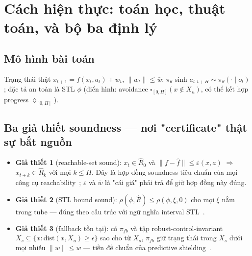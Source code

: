 \documentclass[a4paper,12pt]{article}
\let\stdsection\section
\renewcommand{\section}{\clearpage\stdsection}
\begin{document}
\section{Cách hiện thực: toán học, thuật toán, và bộ ba định lý}\label{sec:implementation}
\subsection{Mô hình bài toán}
Trạng thái thật $x_{t+1}=f(x_t,a_t)+w_t$, $\|w_t\|\le\bar w$; $\pi_\theta$ sinh $a_{t:t+H}\sim\pi_\theta(\cdot\mid o_t)$; đặc tả an toàn là STL $\phi$ (điển hình: avoidance $\square_{[0,H]}(x\notin X_u)$, có thể kết hợp progress $\lozenge_{[0,H]}$).

\subsection{Ba giả thiết soundness --- nơi "certificate" thật sự bắt nguồn}
\begin{itemize}
  \item \textbf{Giả thiết 1} (reachable-set sound): $x_t\in\hat R_0$ và $\|f-\hat f\|\le\varepsilon(x,a)$ $\Rightarrow$ $x_{t+k}\in\hat R_k$ với mọi $k\le H$. Đây là hợp đồng soundness tiêu chuẩn của mọi công cụ reachability~\cite{althoff2015cora,chen2013flowstar}; $\varepsilon$ và $\bar w$ là "cái giá" phải trả để giữ hợp đồng này đúng.
  \item \textbf{Giả thiết 2} (STL bound sound): $\rho(\phi,\hat R)\le\rho(\phi,\xi,0)$ cho mọi $\xi$ nằm trong tube --- đúng theo cấu trúc với ngữ nghĩa interval STL~\cite{deshmukh2017robust}.
  \item \textbf{Giả thiết 3} (fallback tồn tại): có $\pi_{fb}$ và tập robust-control-invariant $X_s\subseteq\{x:\mathrm{dist}(x,X_u)\ge\epsilon\}$ sao cho từ $X_s$, $\pi_{fb}$ giữ trạng thái trong $X_s$ dưới mọi nhiễu $\|w\|\le\bar w$ --- tiền đề chuẩn của predictive shielding~\cite{wabersich2021predictive,bastani2021safe}.
\end{itemize}
\end{document}
